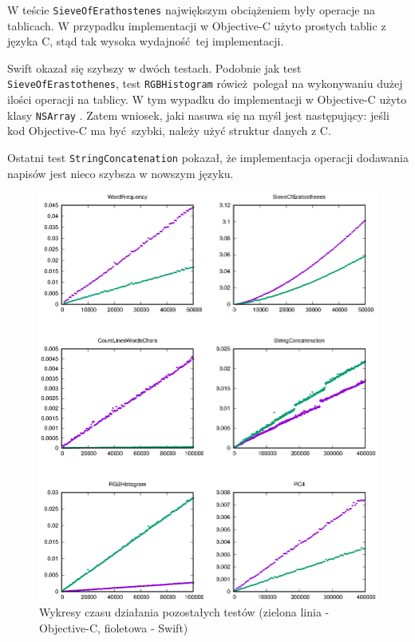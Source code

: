 \documentclass[mgr, shortabstract]{iithesis}
\newcommand{\objcinline}[1]{
    \texttt{#1}
}
\begin{document}
W teście \texttt{SieveOfErathostenes} największym obciążeniem były operacje na tablicach. W przypadku implementacji w Objective-C użyto prostych tablic z języka C, stąd tak wysoka wydajność tej implementacji.

Swift okazał się szybszy w dwóch testach. Podobnie jak test \texttt{SieveOfErastothenes}, test \texttt{RGBHistogram} rówież polegał na wykonywaniu dużej ilości operacji na tablicy. W tym wypadku do implementacji w Objective-C użyto klasy \objcinline{NSArray}. Zatem wniosek, jaki nasuwa się na myśl jest następujący: jeśli kod Objective-C ma być szybki, należy użyć struktur danych z C.

Ostatni test \texttt{StringConcatenation} pokazał, że implementacja operacji dodawania napisów jest nieco szybsza w nowszym języku.

\begin{figure}
    \includegraphics{plots/otherTests}
    \caption{Wykresy czasu działania pozostałych testów (zielona linia - Objective-C, fioletowa - Swift)}
    \label{p:other}
\end{figure}
\end{document}
